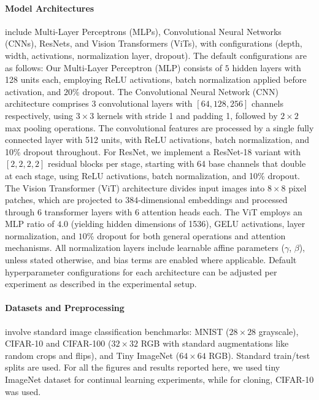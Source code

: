 \documentclass{article}
\numberwithin{figure}{section}
\begin{document}
\paragraph{Model Architectures} include Multi-Layer Perceptrons (MLPs), Convolutional Neural Networks (CNNs), ResNets, and Vision Transformers (ViTs), with configurations (depth, width, activations, normalization layer, dropout). The default configurations are as follows:
Our Multi-Layer Perceptron (MLP) consists of $5$ hidden layers with 128 units each, employing ReLU activations, batch normalization applied before activation, and $20\%$ dropout. The Convolutional Neural Network (CNN) architecture comprises 3 convolutional layers with $[64, 128, 256]$ channels respectively, using $3\times3$ kernels with stride 1 and padding 1, followed by $2\times2$ max pooling operations. The convolutional features are processed by a single fully connected layer with 512 units, with ReLU activations, batch normalization, and 10\% dropout throughout. For ResNet, we implement a ResNet-18 variant with $[2, 2, 2, 2]$ residual blocks per stage, starting with 64 base channels that double at each stage, using ReLU activations, batch normalization, and 10\% dropout. The Vision Transformer (ViT) architecture divides input images into $8\times8$ pixel patches, which are projected to $384$-dimensional embeddings and processed through $6$ transformer layers with $6$ attention heads each. The ViT employs an MLP ratio of $4.0$ (yielding hidden dimensions of 1536), GELU activations, layer normalization, and $10\%$ dropout for both general operations and attention mechanisms. All normalization layers include learnable affine parameters ($\gamma$, $\beta$), unless stated otherwise, and bias terms are enabled where applicable. Default hyperparameter configurations for each architecture can be adjusted per experiment as described in the experimental setup.

\paragraph{Datasets and Preprocessing} involve standard image classification benchmarks: MNIST ($28 \times 28$ grayscale), CIFAR-10 and CIFAR-100 ($32 \times 32$ RGB with standard augmentations like random crops and flips), and Tiny ImageNet ($64 \times 64$ RGB). Standard train/test splits are used. For all the figures and results reported here, we used tiny ImageNet dataset for continual learning experiments, while for cloning, CIFAR-10 was used.   
\end{document}
